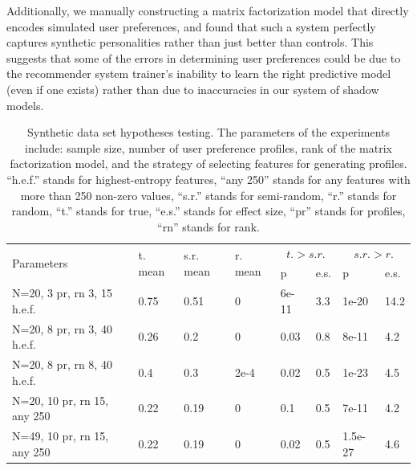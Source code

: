 Additionally, we manually constructing a matrix factorization model
that directly encodes simulated user preferences, and found that such
a system perfectly captures synthetic personalities rather than just
better than controls.
This suggests that some of the errors in determining user preferences
could be due to the recommender system trainer's inability to learn
the right predictive model (even if one exists) rather than due to
inaccuracies in our system of shadow models.
\begin{table}
  \small
  \begin{tabular}{|p{2cm}|p{1cm}|p{1cm}|p{1cm}|p{1cm}|p{1cm}|p{1cm}|p{1cm}|} \hline
    \multirow{2}{*}{Parameters} & \multirow{2}{0.55cm}{t. mean} & \multirow{2}{0.55cm}{s.r. mean} & \multirow{2}{0.55cm}{r. mean} & \multicolumn{2}{|c|}{\mbox{$t. > s.r.$}} & \multicolumn{2}{|c|}{$s.r. > r.$} \\
    \cline{5-8}                 &      &      &      & p     & e.s. & p       & e.s. \\ \hline
    {\scriptsize N=20, 3 pr, rn 3, 15 h.e.f.} & 0.75 & 0.51 & 0    & {\scriptsize 6e-11} & 3.3  & 1e-20   & 14.2 \\ \hline
    {\scriptsize N=20, 8 pr, rn 3, 40 h.e.f.} & 0.26 & 0.2  & 0    & 0.03  & 0.8  & 8e-11   & 4.2 \\ \hline
    {\scriptsize N=20, 8 pr, rn 8, 40 h.e.f.} & 0.4  & 0.3  & {\scriptsize 2e-4} & 0.02  & 0.5  & 1e-23   & 4.5 \\ \hline
    {\scriptsize N=20, 10 pr, rn 15, any 250} & 0.22 & 0.19 & 0    & 0.1   & 0.5  & 7e-11   & 4.2 \\ \hline
    {\scriptsize N=49, 10 pr, rn 15, any 250} & 0.22 & 0.19 & 0    & 0.02  & 0.5  & {\scriptsize 1.5e-27} & 4.6 \\ \hline
  \end{tabular}%
  \caption{\label{table:ttest} Synthetic data set hypotheses testing.
    The parameters of the experiments include: sample size, number of user preference profiles, rank of the matrix factorization model, and the strategy of selecting features for generating profiles.
    ``h.e.f.''
    stands for highest-entropy features, ``any 250'' stands for any features with more than 250 non-zero values, ``s.r.''
    stands for semi-random, ``r.''
    stands for random, ``t.''
    stands for true, ``e.s.''
    stands for effect size, ``pr'' stands for profiles, ``rn'' stands for rank.}
\end{table}

